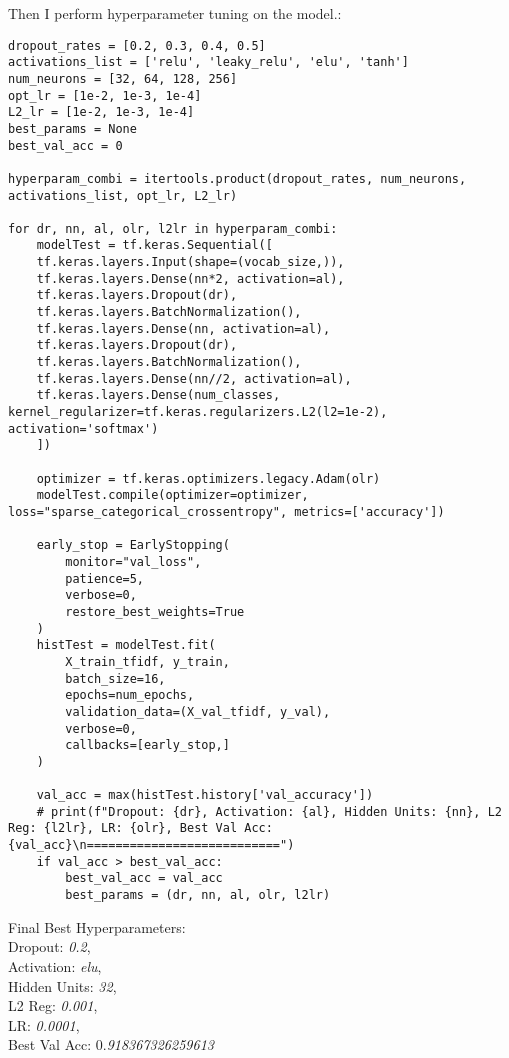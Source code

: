 Then I perform hyperparameter tuning on the model.:
\begin{lstlisting}[frame=single]
dropout_rates = [0.2, 0.3, 0.4, 0.5]
activations_list = ['relu', 'leaky_relu', 'elu', 'tanh']
num_neurons = [32, 64, 128, 256]
opt_lr = [1e-2, 1e-3, 1e-4]
L2_lr = [1e-2, 1e-3, 1e-4]
best_params = None
best_val_acc = 0

hyperparam_combi = itertools.product(dropout_rates, num_neurons, activations_list, opt_lr, L2_lr)

for dr, nn, al, olr, l2lr in hyperparam_combi:
    modelTest = tf.keras.Sequential([
    tf.keras.layers.Input(shape=(vocab_size,)),
    tf.keras.layers.Dense(nn*2, activation=al),
    tf.keras.layers.Dropout(dr),
    tf.keras.layers.BatchNormalization(),
    tf.keras.layers.Dense(nn, activation=al),
    tf.keras.layers.Dropout(dr),
    tf.keras.layers.BatchNormalization(),
    tf.keras.layers.Dense(nn//2, activation=al),
    tf.keras.layers.Dense(num_classes, kernel_regularizer=tf.keras.regularizers.L2(l2=1e-2), activation='softmax')
    ])

    optimizer = tf.keras.optimizers.legacy.Adam(olr)
    modelTest.compile(optimizer=optimizer, loss="sparse_categorical_crossentropy", metrics=['accuracy'])
    
    early_stop = EarlyStopping(
        monitor="val_loss",
        patience=5,
        verbose=0,
        restore_best_weights=True
    )
    histTest = modelTest.fit(
        X_train_tfidf, y_train,
        batch_size=16,
        epochs=num_epochs,
        validation_data=(X_val_tfidf, y_val),
        verbose=0,
        callbacks=[early_stop,]
    )

    val_acc = max(histTest.history['val_accuracy'])
    # print(f"Dropout: {dr}, Activation: {al}, Hidden Units: {nn}, L2 Reg: {l2lr}, LR: {olr}, Best Val Acc: {val_acc}\n===========================")
    if val_acc > best_val_acc:
        best_val_acc = val_acc
        best_params = (dr, nn, al, olr, l2lr)
\end{lstlisting}

Final Best Hyperparameters:\\
Dropout: \textit{0.2},\\
Activation: \textit{elu},\\
Hidden Units: \textit{32},\\
L2 Reg: \textit{0.001},\\
LR: \textit{0.0001},\\
Best Val Acc: 0.\textit{918367326259613}\\

